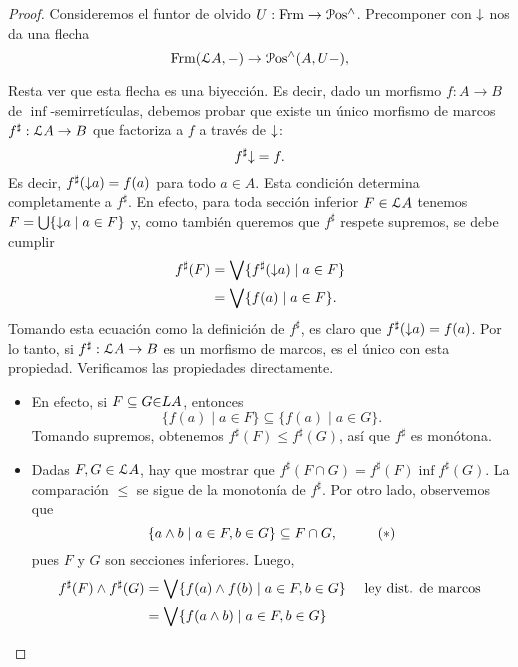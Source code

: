 \begin{proof}

    Consideremos el funtor de olvido $U:\Frm\to\Pos^{\inf}$.
    Precomponer con $\down$ nos da una flecha
    \[
        \Frm(\cal LA,-)\to \Pos^{\inf}(A,U-)
    ,\]
    
    Resta ver que esta flecha es una biyección.
    Es decir, dado un morfismo $f:A\to B$
    de $\inf$-semirretículas,
    debemos probar que existe un único morfismo de marcos
    $f^\sharp:\cal LA\to B$ que factoriza a $f$ a través
    de $\down$:
    \[
        f^\sharp\down = f
    .\]
    Es decir, $f^\sharp(\down a)=f(a)$ para todo $a\in A$.
    Esta condición determina completamente a $f^\sharp$.
    En efecto, para toda sección inferior $F\in\cal LA$ tenemos
    $F=\bigcup\{\down a \mid a\in F\}$ y, como también queremos
    que $f^\sharp$ respete supremos, se debe cumplir
    \begin{align*}
        f^\sharp(F)
        &= \Sup\{f^\sharp(\down a) \mid a\in F\} \\
        &= \Sup\{f(a) \mid a\in F\}.
    \end{align*}
    Tomando esta ecuación como la definición de $f^\sharp$, es
    claro que $f^\sharp(\down a)=f(a)$.
    Por lo tanto, si $f^\sharp:\cal LA\to B$ es un
    morfismo de marcos, es el único con esta propiedad.
    Verificamos las propiedades directamente.
    \begin{itemize}
        \item En efecto, si $F\subseteq G\cal\in LA$, entonces 
        \[
            \{f(a) \mid a\in F\} \subseteq \{f(a) \mid a\in G\}
        .\]
        Tomando supremos, obtenemos
        $f^\sharp(F)\leq f^\sharp(G)$, así que $f^\sharp$ es
        monótona.
        \item
        Dadas $F,G\in\cal LA$, hay que mostrar
        que $f^\sharp(F\cap G)=f^\sharp(F)\inf f^\sharp(G)$.
        La comparación $\leq$ se sigue de la monotonía de
        $f^\sharp$.
        Por otro lado, observemos que
        \[
            \{ a\inf b \mid a\in F, b\in G\}
            \subseteq F\cap G,
            \hspace{10mm} (*)
        \]
        pues $F$ y $G$ son secciones inferiores.
        Luego,
        \begin{align*}
            f^\sharp(F)\inf f^\sharp(G)
            &= \Sup\{f(a)\inf f(b) \mid a\in F, b\in G\}
                && \text{ ley dist. de marcos } \\
            &= \Sup\{f(a\inf b) \mid a\in F, b\in G\} \\

\end{align*}
\end{itemize}
\end{proof}
